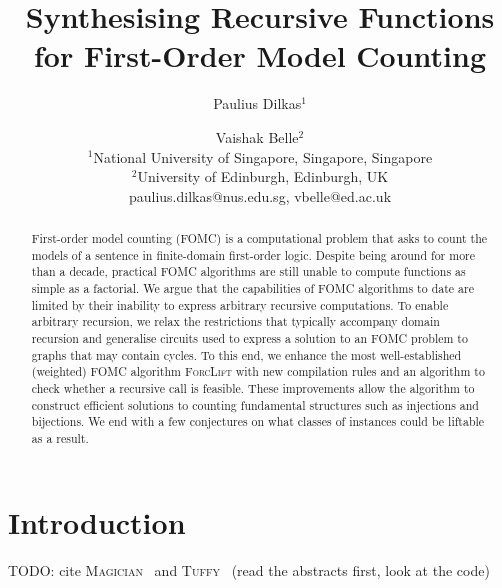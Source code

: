 \documentclass{article}
\title{Synthesising Recursive Functions for First-Order Model Counting}
\author{%
Paulius Dilkas$^1$\and
Vaishak Belle$^2$\\
\affiliations
$^1$National University of Singapore, Singapore, Singapore\\
$^2$University of Edinburgh, Edinburgh, UK\\
\emails
paulius.dilkas@nus.edu.sg,
vbelle@ed.ac.uk
}
\theoremstyle{definition}
\begin{document}
\maketitle

\begin{abstract}
  First-order model counting (FOMC) is a computational problem that asks to
  count the models of a sentence in finite-domain first-order logic. Despite
  being around for more than a decade, practical FOMC algorithms are still
  unable to compute functions as simple as a factorial. We argue that the
  capabilities of FOMC algorithms to date are limited by their inability to
  express arbitrary recursive computations. To enable arbitrary recursion, we
  relax the restrictions that typically accompany domain recursion and
  generalise circuits used to express a solution to an FOMC problem to graphs
  that may contain cycles. To this end, we enhance the most well-established
  (weighted) FOMC algorithm \textsc{ForcLift} with new compilation rules and an
  algorithm to check whether a recursive call is feasible. These improvements
  allow the algorithm to construct efficient solutions to counting fundamental
  structures such as injections and bijections. We end with a few conjectures on
  what classes of instances could be liftable as a result.
\end{abstract}

\section{Introduction}


TODO: cite \textsc{Magician}~\cite{DBLP:conf/aaai/VenugopalSG15} and
\textsc{Tuffy}~\cite{DBLP:journals/pvldb/NiuRDS11} (read the abstracts first,
look at the code)

\end{document}
